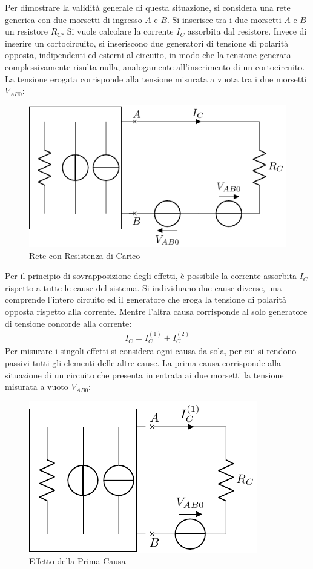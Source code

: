 \documentclass{article}
\numberwithin{equation}{subsection}
\begin{document}
Per dimostrare la validità generale di questa situazione, si considera una rete generica con due morsetti di ingresso $A$ e $B$. 
Si inserisce tra i due morsetti $A$ e $B$ un resistore $R_C$. Si vuole calcolare la corrente $I_C$ assorbita 
dal resistore. Invece di inserire un cortocircuito, si inseriscono due generatori di tensione di polarità opposta, indipendenti ed esterni al circuito, in modo che la tensione 
generata complessivamente risulta nulla, analogamente all'inserimento di un cortocircuito. La tensione erogata corrisponde alla tensione misurata a vuota tra i due morsetti 
$V_{AB0}$: 
\begin{figure}[H]%
    \centering
    \includegraphics{calcolo-corrente-carico.pdf}
    \caption{Rete con Resistenza di Carico}
    \label{fig:calcolo-corrente-carico}
\end{figure}
Per il principio di sovrapposizione degli effetti, è possibile la corrente assorbita $I_C$ rispetto a tutte le cause del sistema. Si individuano due cause diverse, una 
comprende l'intero circuito ed il generatore che eroga la tensione di polarità opposta rispetto alla corrente. Mentre l'altra causa corrisponde al solo generatore di 
tensione concorde alla corrente:
\begin{gather*}
    I_C=I_C^{(1)}+I_C^{(2)}
\end{gather*} 
Per misurare i singoli effetti si considera ogni causa da sola, per cui si rendono passivi tutti gli elementi delle altre cause. 
La prima causa corrisponde alla situazione di un circuito che presenta in entrata ai due morsetti la tensione misurata a vuoto $V_{AB0}$: 
\begin{figure}[H]%
    \centering
    \includegraphics{prima-causa-corrente-carico.pdf}
    \caption{Effetto della Prima Causa}
    \label{fig:prima-causa-corrente-carico}
\end{figure} 
\end{document}
